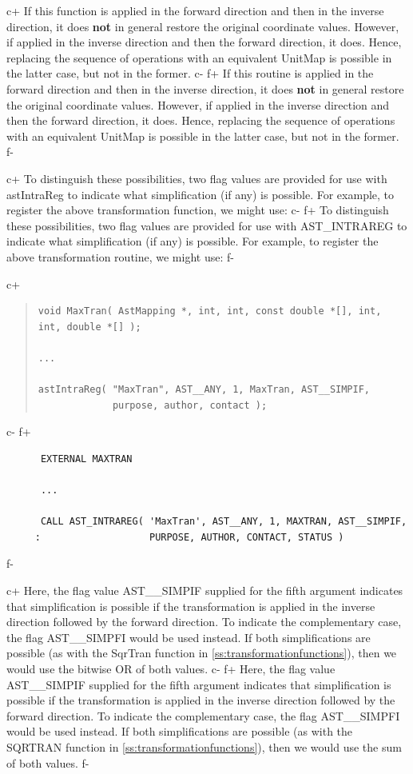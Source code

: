 \documentclass[twoside,11pt]{article}
\newcommand{\secref}[1]{\S\ref{#1}}
\renewcommand{\secref}[1]{\ref{#1}}
\begin{document}
c+
If this function is applied in the forward direction and then in the
inverse direction, it does {\bf{not}} in general restore the original
coordinate values. However, if applied in the inverse direction and
then the forward direction, it does. Hence, replacing the sequence of
operations with an equivalent UnitMap is possible in the latter case,
but not in the former.
c-
f+
If this routine is applied in the forward direction and then in the
inverse direction, it does {\bf{not}} in general restore the original
coordinate values. However, if applied in the inverse direction and
then the forward direction, it does. Hence, replacing the sequence of
operations with an equivalent UnitMap is possible in the latter case,
but not in the former.
f-

c+
To distinguish these possibilities, two flag values are provided for
use with astIntraReg to indicate what simplification (if any) is
possible. For example, to register the above transformation function,
we might use:
c-
f+
To distinguish these possibilities, two flag values are provided for
use with AST\_INTRAREG to indicate what simplification (if any) is
possible. For example, to register the above transformation routine,
we might use:
f-

c+
\begin{quote}
\small
\begin{verbatim}
void MaxTran( AstMapping *, int, int, const double *[], int, int, double *[] );

...

astIntraReg( "MaxTran", AST__ANY, 1, MaxTran, AST__SIMPIF,
             purpose, author, contact );
\end{verbatim}
\normalsize
\end{quote}
c-
f+
\small
\begin{verbatim}
      EXTERNAL MAXTRAN

      ...

      CALL AST_INTRAREG( 'MaxTran', AST__ANY, 1, MAXTRAN, AST__SIMPIF,
     :                   PURPOSE, AUTHOR, CONTACT, STATUS )
\end{verbatim}
\normalsize
f-

c+
Here, the flag value AST\_\_SIMPIF supplied for the fifth argument
indicates that simplification is possible if the transformation is
applied in the inverse direction followed by the forward direction. To
indicate the complementary case, the flag AST\_\_SIMPFI would be used
instead. If both simplifications are possible (as with the SqrTran
function in \secref{ss:transformationfunctions}), then we would use
the bitwise OR of both values.
c-
f+
Here, the flag value AST\_\_SIMPIF supplied for the fifth argument
indicates that simplification is possible if the transformation is
applied in the inverse direction followed by the forward direction. To
indicate the complementary case, the flag AST\_\_SIMPFI would be used
instead. If both simplifications are possible (as with the SQRTRAN
function in \secref{ss:transformationfunctions}), then we would use
the sum of both values.
f-
\end{document}

